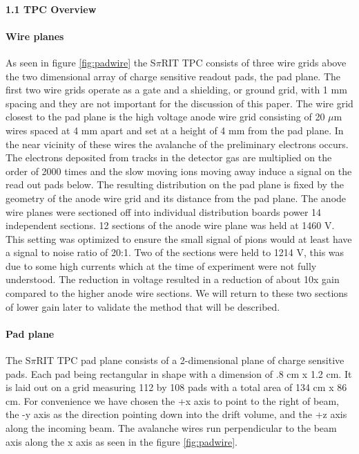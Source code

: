 \documentclass[review]{elsarticle}
\begin{document}
\paragraph{1.1 TPC Overview}
\paragraph{Wire planes}
As seen in figure \ref{fig:padwire} the S$\pi$RIT TPC consists of three wire grids above the two dimensional array of charge sensitive readout pads, the pad plane. The first two wire grids operate as a gate and a shielding, or ground grid, with 1 mm spacing and they are not important for the discussion of this paper. The wire grid closest to the pad plane is the high voltage anode wire grid consisting of 20 $\mu$m wires spaced at 4 mm apart and set at a height of 4 mm from the pad plane. In the near vicinity of these wires the avalanche of the preliminary electrons occurs. The electrons deposited from tracks in the detector gas are multiplied on the order of 2000  times and the slow moving ions moving away induce a signal on the read out pads below. The resulting distribution on the pad plane is fixed by the geometry of the anode wire grid and its distance from the pad plane. The anode wire planes were sectioned off into individual distribution boards power 14 independent sections. 12 sections of the anode wire plane was held at 1460 V. This setting was optimized to ensure the small signal of pions would at least have a signal to noise ratio of 20:1. Two of the sections were held to 1214 V, this was due to some high currents which at the time of experiment were not fully understood. The reduction in voltage resulted in a reduction of about 10x gain compared to the higher anode wire sections. We will return to these two sections of lower gain later to validate the method that will be described. 
\paragraph{Pad plane} 
The S$\pi$RIT TPC pad plane consists of a 2-dimensional plane of charge sensitive pads. Each pad being rectangular in shape with a dimension of .8 cm x 1.2 cm. It is laid out on a grid measuring 112 by 108 pads with a total area of 134 cm x 86 cm. For convenience we have chosen the +x axis to point to the right of beam, the -y axis as the direction pointing down into the drift volume, and the +z axis along the incoming beam. The avalanche wires run perpendicular to the beam axis along the x axis as seen in the figure \ref{fig:padwire}. 
\end{document}

